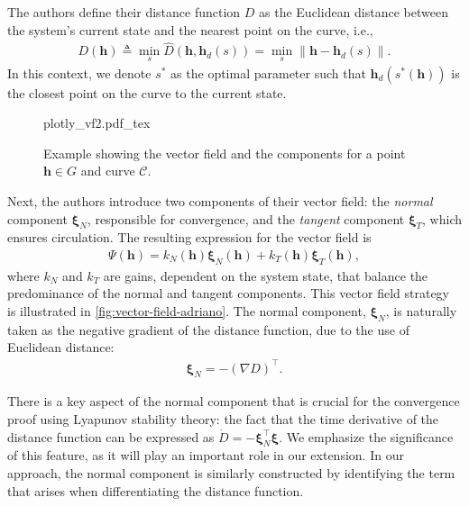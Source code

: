 The authors define their distance function $D$ as the Euclidean distance between the system's current state and the nearest point on the curve, i.e., 
\begin{align}
    D(\mathbf{h}) \triangleq \min_{s}\widehat{D}(\mathbf{h}, \mathbf{h}_d(s))=\min_{s}\|\mathbf{h}- \mathbf{h}_d(s)\|. \label{eq:adriano-EC-distance}   
\end{align}
In this context, we denote $s^*$ as the optimal parameter such that $\mathbf{h}_d(s^*(\mathbf{h}))$ is the closest point on the curve to the current state.
\begin{figure}
    \centering
    \def\svgwidth{.8\linewidth}
    {plotly_vf2.pdf_tex}
    \caption{Example showing the vector field and the components for a point $\mathbf{h}\in G$ and curve $\mathcal{C}$.}
    \label{fig:vector-field-adriano}
\end{figure}

Next, the authors introduce two components of their vector field: the \emph{normal} component $\boldsymbol{\xi}_{N}$, responsible for convergence, and the \emph{tangent} component $\boldsymbol{\xi}_{T}$, which ensures circulation. The resulting expression for the vector field is 
\begin{align}
    \Psi(\mathbf{h}) = k_N(\mathbf{h})\boldsymbol{\xi}_{N}(\mathbf{h}) + k_T(\mathbf{h})\boldsymbol{\xi}_{T}(\mathbf{h}), \label{eq:adriano-vector-field-expression}    
\end{align}
where $k_N$ and $k_T$ are gains, dependent on the system state, that balance the predominance of the normal and tangent components. This vector field strategy is illustrated in \autoref{fig:vector-field-adriano}. The normal component, $\boldsymbol{\xi}_{N}$, is naturally taken as the negative gradient of the distance function, due to the use of Euclidean distance:
\begin{align}
    \boldsymbol{\xi}_{N} = -(\nabla D)^\top.
\end{align}

There is a key aspect of the normal component that is crucial for the convergence proof using Lyapunov stability theory: the fact that the time derivative of the distance function can be expressed as $\dot{D}=-\boldsymbol{\xi}_{N}^{\top}{\boldsymbol{\xi}}$. We emphasize the significance of this feature, as it will play an important role in our extension. In our approach, the normal component is similarly constructed by identifying the term that arises when differentiating the distance function.


